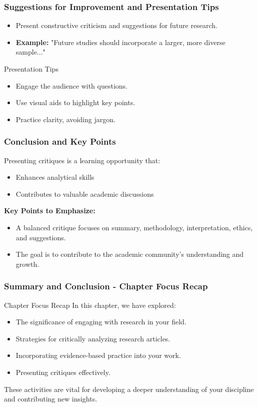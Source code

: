 \documentclass[aspectratio=169]{beamer}
\begin{document}
\begin{frame}[fragile]
    \frametitle{Suggestions for Improvement and Presentation Tips}
    \begin{itemize}
        \item Present constructive criticism and suggestions for future research.
        \item \textbf{Example:} "Future studies should incorporate a larger, more diverse sample..."
    \end{itemize}
    \begin{block}{Presentation Tips}
        \begin{itemize}
            \item Engage the audience with questions.
            \item Use visual aids to highlight key points.
            \item Practice clarity, avoiding jargon.
        \end{itemize}
    \end{block}
\end{frame}

\begin{frame}[fragile]
    \frametitle{Conclusion and Key Points}
    Presenting critiques is a learning opportunity that:
    \begin{itemize}
        \item Enhances analytical skills
        \item Contributes to valuable academic discussions
    \end{itemize}
    \textbf{Key Points to Emphasize:}
    \begin{itemize}
        \item A balanced critique focuses on summary, methodology, interpretation, ethics, and suggestions.
        \item The goal is to contribute to the academic community's understanding and growth.
    \end{itemize}
\end{frame}

\begin{frame}[fragile]
    \frametitle{Summary and Conclusion - Chapter Focus Recap}
    \begin{block}{Chapter Focus Recap}
        In this chapter, we have explored:
        \begin{itemize}
            \item The significance of engaging with research in your field.
            \item Strategies for critically analyzing research articles.
            \item Incorporating evidence-based practice into your work.
            \item Presenting critiques effectively.
        \end{itemize}
        These activities are vital for developing a deeper understanding of your discipline and contributing new insights.
    \end{block}
\end{frame}
\end{document}
